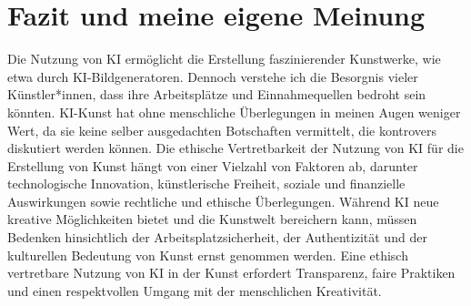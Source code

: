 \documentclass{article}
\begin{document}
\section{Fazit und meine eigene Meinung}
    Die Nutzung von KI ermöglicht die Erstellung faszinierender Kunstwerke, wie etwa durch KI-Bildgeneratoren. Dennoch verstehe ich die Besorgnis vieler Künstler*innen, dass ihre Arbeitsplätze und Einnahmequellen bedroht sein könnten. KI-Kunst hat ohne menschliche Überlegungen in meinen Augen weniger Wert, da sie keine selber ausgedachten Botschaften vermittelt, die kontrovers diskutiert werden können. 
    \newline Die ethische Vertretbarkeit der Nutzung von KI für die Erstellung von Kunst hängt von einer Vielzahl von Faktoren ab, darunter technologische Innovation, künstlerische Freiheit, soziale und finanzielle Auswirkungen sowie rechtliche und ethische Überlegungen. Während KI neue kreative Möglichkeiten bietet und die Kunstwelt bereichern kann, müssen Bedenken hinsichtlich der Arbeitsplatzsicherheit, der Authentizität und der kulturellen Bedeutung von Kunst ernst genommen werden. Eine ethisch vertretbare Nutzung von KI in der Kunst erfordert Transparenz, faire Praktiken und einen respektvollen Umgang mit der menschlichen Kreativität.

\printbibliography
\end{document}
